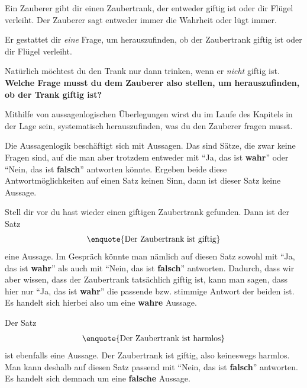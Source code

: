 \documentclass[../../main.tex]{subfiles}
\begin{document}
    \begin{example}{}
        
        Ein Zauberer gibt dir einen Zaubertrank, der entweder giftig ist oder dir Flügel verleiht. Der Zauberer sagt entweder immer die Wahrheit oder lügt immer.
        
        Er gestattet dir \emph{eine} Frage, um herauszufinden, ob der Zaubertrank giftig ist oder dir Flügel verleiht.
        
        Natürlich möchtest du den Trank nur dann trinken, wenn er \emph{nicht} giftig ist. \textbf{Welche Frage musst du dem Zauberer also stellen, um herauszufinden, ob der Trank giftig ist?}
        
        Mithilfe von aussagenlogischen Überlegungen wirst du im Laufe des Kapitels in der Lage sein, systematisch herauszufinden, was du den Zauberer fragen musst.
    \end{example}
    
    Die Aussagenlogik beschäftigt sich mit Aussagen. Das sind Sätze, die zwar keine Fragen sind, auf die man aber trotzdem entweder mit \enquote{Ja, das ist \textbf{wahr}} oder \enquote{Nein, das ist \textbf{falsch}} antworten könnte. Ergeben beide diese Antwortmöglichkeiten auf einen Satz keinen Sinn, dann ist dieser Satz keine Aussage.
    \begin{example}{}
        Stell dir vor du hast wieder einen giftigen Zaubertrank gefunden. Dann ist der Satz
        \[\textrm{\enquote{Der Zaubertrank ist giftig}}\]
        eine Aussage.
        Im Gespräch könnte man nämlich auf diesen Satz sowohl mit \enquote{Ja, das ist \textbf{wahr}} als auch mit \enquote{Nein, das ist \textbf{falsch}} antworten. 
        Dadurch, dass wir aber wissen, dass der Zaubertrank tatsächlich giftig ist, kann man sagen, dass hier nur \enquote{Ja, das ist \textbf{wahr}} die passende bzw. stimmige Antwort der beiden ist. Es handelt sich hierbei also um eine \textbf{wahre} Aussage.
        
        Der Satz
        \[\textrm{\enquote{Der Zaubertrank ist harmlos}}\]
        ist ebenfalls eine Aussage. Der Zaubertrank ist giftig, also keineswegs harmlos. Man kann deshalb auf diesen Satz passend mit \enquote{Nein, das ist \textbf{falsch}} antworten. Es handelt sich demnach um eine \textbf{falsche} Aussage.
    \end{example}
    
\end{document}
